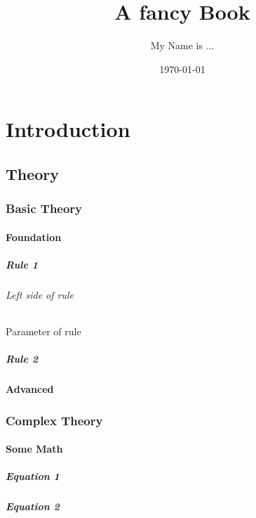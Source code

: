 \documentclass[12pt, a4paper, twoside, titlepage]{book}
\title{A fancy Book}
\author{My Name is ...}
\date{\today}
\begin{document}
\maketitle

\tableofcontents 

\clearpage

\part{Introduction}
\chapter{Theory}
\section{Basic Theory}
    \subsection{Foundation}
        \subsubsection{Rule 1}
                \paragraph{Left side of rule}
                    \subparagraph{Parameter of rule }
        \subsubsection{Rule 2}
    \subsection{Advanced}
\section{Complex Theory}
    \subsection{Some Math}
        \subsubsection{Equation 1}
        \subsubsection{Equation 2}
\end{document}
